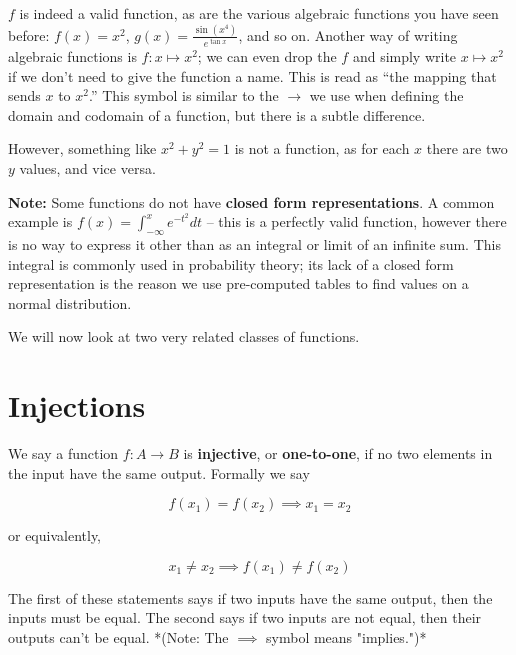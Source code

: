 \documentclass{article}
\begin{document}
$f$ is indeed a valid function, as are the various algebraic functions you have seen before: $f(x) = x^2$, $g(x) = \frac{\sin(x^4)}{e^{\tan x}}$, and so on. Another way of writing algebraic functions is $f: x \mapsto x^2$; we can even drop the $f$ and simply write $x \mapsto x^2$ if we don't need to give the function a name. This is read as ``the mapping that sends $x$ to $x^2$.'' This symbol is similar to the $\rightarrow$ we use when defining the domain and codomain of a function, but there is a subtle difference.

However, something like $x^2 + y^2 = 1$ is not a function, as for each $x$ there are two $y$ values, and vice versa.

\textbf{Note:} Some functions do not have \textbf{closed form representations}. A common example is $f(x) = \int_{-\infty}^x e^{-t^2}dt$ – this is a perfectly valid function, however there is no way to express it other than as an integral or limit of an infinite sum. This integral is commonly used in probability theory; its lack of a closed form representation is the reason we use pre-computed tables to find values on a normal distribution.

We will now look at two very related classes of functions.

\section{Injections}

We say a function $f : A \rightarrow B$ is \textbf{injective}, or \textbf{one-to-one}, if no two elements in the input have the same output. Formally we say

\[\boxed{f(x_1) = f(x_2) \implies x_1 = x_2}\]

or equivalently,

\[\boxed{x_1 \neq x_2 \implies f(x_1) \neq f(x_2)}\]

The first of these statements says if two inputs have the same output, then the inputs must be equal. The second says if two inputs are not equal, then their outputs can't be equal. *(Note: The $\implies$ symbol means "implies.")*
\end{document}

